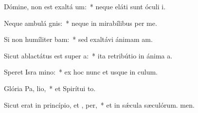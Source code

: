 \item Dómine, non est exaltá  um:~* neque eláti sunt óculi i.
\item Neque ambulá  gnis:~* neque in mirabílibus per me.
\item Si non humíliter bam:~* sed exaltávi ánimam am.
\item Sicut ablactátus est super  a:~* ita retribútio in ánima a.
\item Speret Isra  mino:~* ex hoc nunc et usque in culum.
\item Glória Pa,  lio,~* et Spirítui to.
\item Sicut erat in princípio, et ,  per,~* et in sǽcula sæculórum. men.
